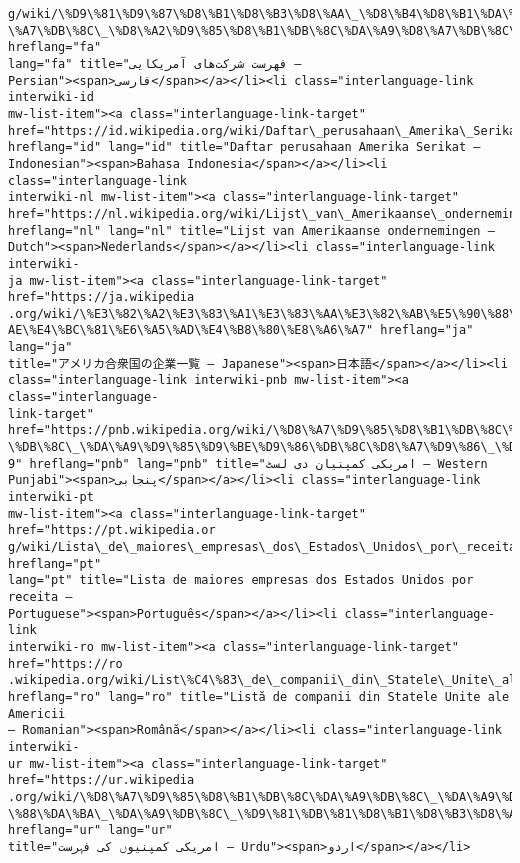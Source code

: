 \documentclass[11pt]{article}
\begin{document}
\begin{Verbatim}[commandchars=\\\{\}]
g/wiki/\%D9\%81\%D9\%87\%D8\%B1\%D8\%B3\%D8\%AA\_\%D8\%B4\%D8\%B1\%DA\%A9\%D8\%AA\%E2\%80\%8C\%D9\%87\%D8
\%A7\%DB\%8C\_\%D8\%A2\%D9\%85\%D8\%B1\%DB\%8C\%DA\%A9\%D8\%A7\%DB\%8C\%DB\%8C" hreflang="fa"
lang="fa" title="فهرست شرکت‌های آمریکایی –
Persian"><span>فارسی</span></a></li><li class="interlanguage-link interwiki-id
mw-list-item"><a class="interlanguage-link-target"
href="https://id.wikipedia.org/wiki/Daftar\_perusahaan\_Amerika\_Serikat"
hreflang="id" lang="id" title="Daftar perusahaan Amerika Serikat –
Indonesian"><span>Bahasa Indonesia</span></a></li><li class="interlanguage-link
interwiki-nl mw-list-item"><a class="interlanguage-link-target"
href="https://nl.wikipedia.org/wiki/Lijst\_van\_Amerikaanse\_ondernemingen"
hreflang="nl" lang="nl" title="Lijst van Amerikaanse ondernemingen –
Dutch"><span>Nederlands</span></a></li><li class="interlanguage-link interwiki-
ja mw-list-item"><a class="interlanguage-link-target" href="https://ja.wikipedia
.org/wiki/\%E3\%82\%A2\%E3\%83\%A1\%E3\%83\%AA\%E3\%82\%AB\%E5\%90\%88\%E8\%A1\%86\%E5\%9B\%BD\%E3\%81\%
AE\%E4\%BC\%81\%E6\%A5\%AD\%E4\%B8\%80\%E8\%A6\%A7" hreflang="ja" lang="ja"
title="アメリカ合衆国の企業一覧 – Japanese"><span>日本語</span></a></li><li
class="interlanguage-link interwiki-pnb mw-list-item"><a class="interlanguage-
link-target" href="https://pnb.wikipedia.org/wiki/\%D8\%A7\%D9\%85\%D8\%B1\%DB\%8C\%DA\%A9
\%DB\%8C\_\%DA\%A9\%D9\%85\%D9\%BE\%D9\%86\%DB\%8C\%D8\%A7\%D9\%86\_\%D8\%AF\%DB\%8C\_\%D9\%84\%D8\%B3\%D9\%B
9" hreflang="pnb" lang="pnb" title="امریکی کمپنیان دی لسٹ – Western
Punjabi"><span>پنجابی</span></a></li><li class="interlanguage-link interwiki-pt
mw-list-item"><a class="interlanguage-link-target" href="https://pt.wikipedia.or
g/wiki/Lista\_de\_maiores\_empresas\_dos\_Estados\_Unidos\_por\_receita" hreflang="pt"
lang="pt" title="Lista de maiores empresas dos Estados Unidos por receita –
Portuguese"><span>Português</span></a></li><li class="interlanguage-link
interwiki-ro mw-list-item"><a class="interlanguage-link-target" href="https://ro
.wikipedia.org/wiki/List\%C4\%83\_de\_companii\_din\_Statele\_Unite\_ale\_Americii"
hreflang="ro" lang="ro" title="Listă de companii din Statele Unite ale Americii
– Romanian"><span>Română</span></a></li><li class="interlanguage-link interwiki-
ur mw-list-item"><a class="interlanguage-link-target" href="https://ur.wikipedia
.org/wiki/\%D8\%A7\%D9\%85\%D8\%B1\%DB\%8C\%DA\%A9\%DB\%8C\_\%DA\%A9\%D9\%85\%D9\%BE\%D9\%86\%DB\%8C\%D9
\%88\%DA\%BA\_\%DA\%A9\%DB\%8C\_\%D9\%81\%DB\%81\%D8\%B1\%D8\%B3\%D8\%AA" hreflang="ur" lang="ur"
title="امریکی کمپنیوں کی فہرست – Urdu"><span>اردو</span></a></li>

\end{Verbatim}
\end{document}
